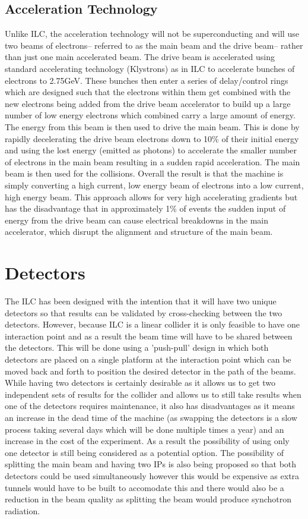 \subsection{Acceleration Technology}
Unlike \ac{ILC}, the acceleration technology will not be superconducting and will use two beams of electrons-- referred to as the main beam and the drive beam-- rather than just one main accelerated beam. The drive beam is accelerated using standard accelerating technology (Klystrons) as in \ac{ILC} to accelerate bunches of electrons to 2.75GeV. These bunches then enter a series of delay/control rings which are designed such that the electrons within them get combined with the new electrons being added from the drive beam accelerator to build up a large number of low energy electrons which combined carry a large amount of energy. The energy from this beam is then used to drive the main beam. This is done by rapidly decelerating the drive beam electrons down to 10\% of their initial energy and using the lost energy (emitted as photons) to accelerate the smaller number of electrons in the main beam resulting in a sudden rapid acceleration. The main beam is then used for the collisions. Overall the result is that the machine is simply converting a high current, low energy beam of electrons into a low current, high energy beam. This approach allows for very high accelerating gradients but has the disadvantage that in approximately 1\% of events the sudden input of energy from the drive beam can cause electrical breakdowns in the main accelerator, which disrupt the alignment and structure of the main beam.


\section{Detectors}
The \ac{ILC} has been designed with the intention that it will have two unique detectors so that results can be validated by cross-checking between the two detectors. However, because \ac{ILC} is a linear collider it is only feasible to have one interaction point and as a result the beam time will have to be shared between the detectors. This will be done using a 'push-pull' design in which both detectors are placed on a single platform at the interaction point which can be moved back and forth to position the desired detector in the path of the beams. While having two detectors is certainly desirable as it allows us to get two independent sets of results for the collider and allows us to still take results when one of the detectors requires maintenance, it also has disadvantages as it means an increase in the dead time of the machine (as swapping the detectors is a slow process taking several days which will be done multiple times a year) and an increase in the cost of the experiment. As a result the possibility of using only one detector is still being considered as a potential option. The possibility of splitting the main beam and having two IPs is also being proposed so that both detectors could be used simultaneously however this would be expensive as extra tunnels would have to be built to accomodate this and there would also be a reduction in the beam quality as splitting the beam would produce synchotron radiation.
